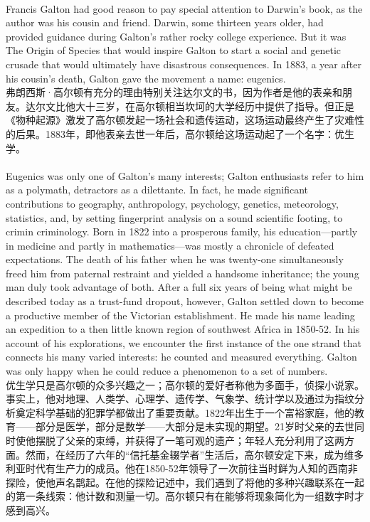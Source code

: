 \documentclass{article}
\begin{document}
\\
Francis Galton had good reason to pay special attention to Darwin’s book, as the author was his cousin and friend. Darwin, some thirteen years older, had provided guidance during Galton’s rather rocky college experience. But it was The Origin of Species that would inspire Galton to start a social and genetic crusade that would ultimately have disastrous consequences. In 1883, a year after his cousin’s death, Galton gave the movement a name: eugenics.\\
弗朗西斯·高尔顿有充分的理由特别关注达尔文的书，因为作者是他的表亲和朋友。达尔文比他大十三岁，在高尔顿相当坎坷的大学经历中提供了指导。但正是《物种起源》激发了高尔顿发起一场社会和遗传运动，这场运动最终产生了灾难性的后果。1883年，即他表亲去世一年后，高尔顿给这场运动起了一个名字：优生学。\\

\\
Eugenics was only one of Galton’s many interests; Galton enthusiasts refer to him as a polymath, detractors as a dilettante. In fact, he made significant contributions to geography, anthropology, psychology, genetics, meteorology, statistics, and, by setting fingerprint analysis on a sound scientific footing, to crimin criminology. Born in 1822 into a prosperous family, his education—partly in medicine and partly in mathematics—was mostly a chronicle of defeated expectations. The death of his father when he was twenty-one simultaneously freed him from paternal restraint and yielded a handsome inheritance; the young man duly took advantage of both. After a full six years of being what might be described today as a trust-fund dropout, however, Galton settled down to become a productive member of the Victorian establishment. He made his name leading an expedition to a then little known region of southwest Africa in 1850-52. In his account of his explorations, we encounter the first instance of the one strand that connects his many varied interests: he counted and measured everything. Galton was only happy when he could reduce a phenomenon to a set of numbers.\\
优生学只是高尔顿的众多兴趣之一；高尔顿的爱好者称他为多面手，侦探小说家。事实上，他对地理、人类学、心理学、遗传学、气象学、统计学以及通过为指纹分析奠定科学基础的犯罪学都做出了重要贡献。1822年出生于一个富裕家庭，他的教育——部分是医学，部分是数学——大部分是未实现的期望。21岁时父亲的去世同时使他摆脱了父亲的束缚，并获得了一笔可观的遗产；年轻人充分利用了这两方面。然而，在经历了六年的“信托基金辍学者”生活后，高尔顿安定下来，成为维多利亚时代有生产力的成员。他在1850-52年领导了一次前往当时鲜为人知的西南非探险，使他声名鹊起。在他的探险记述中，我们遇到了将他的多种兴趣联系在一起的第一条线索：他计数和测量一切。高尔顿只有在能够将现象简化为一组数字时才感到高兴。\\
\end{document}

